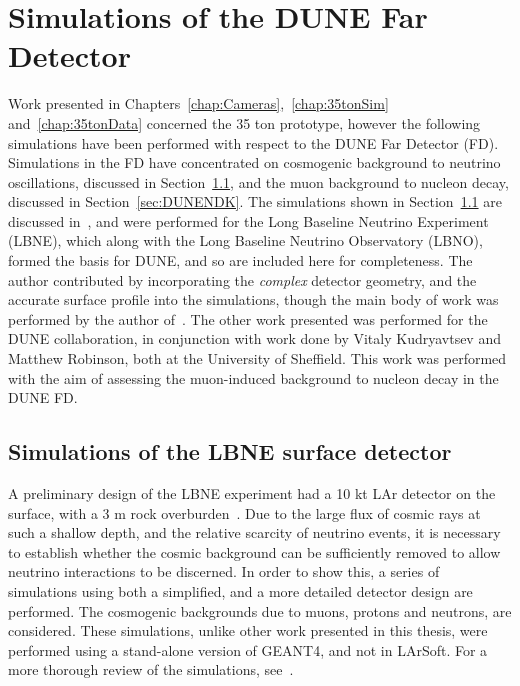 

\chapter{Simulations of the DUNE Far Detector} \label{chap:FDSims} %
\graphicspath{{FarDetectorSimulations/Figs/Raster/}{FarDetectorSimulations/Figs/PDF/}{FarDetectorSimulations/Figs/Vector/}}

Work presented in Chapters~\ref{chap:Cameras},~\ref{chap:35tonSim} and~\ref{chap:35tonData} concerned the 35 ton prototype, however the following simulations have been performed with respect to the DUNE Far Detector (FD). Simulations in the FD have concentrated on cosmogenic background to neutrino oscillations, discussed in Section~\ref{sec:LBNESurf}, and the muon background to nucleon decay, discussed in Section~\ref{sec:DUNENDK}. The simulations shown in Section~\ref{sec:LBNESurf} are discussed in~\citep{MartinsThesis}, and were performed for the Long Baseline Neutrino Experiment (LBNE), which along with the Long Baseline Neutrino Observatory (LBNO), formed the basis for DUNE, and so are included here for completeness. The author contributed by incorporating the \emph{complex} detector geometry, and the accurate surface profile into the simulations, though the main body of work was performed by the author of~\citep{MartinsThesis}. The other work presented was performed for the DUNE collaboration, in conjunction with work done by Vitaly Kudryavtsev and Matthew Robinson, both at the University of Sheffield. This work was performed with the aim of assessing the muon-induced background to nucleon decay in the DUNE FD. \\

\section{Simulations of the LBNE surface detector} \label{sec:LBNESurf} %
A preliminary design of the LBNE experiment had a 10 kt LAr detector on the surface, with a 3 m rock overburden~\citep{LBNE6493}. Due to the large flux of cosmic rays at such a shallow depth, and the relative scarcity of neutrino events, it is necessary to establish whether the cosmic background can be sufficiently removed to allow neutrino interactions to be discerned. In order to show this, a series of simulations using both a simplified, and a more detailed detector design are performed. The cosmogenic backgrounds due to muons, protons and neutrons, are considered. These simulations, unlike other work presented in this thesis, were performed using a stand-alone version of GEANT4, and not in LArSoft. For a more thorough review of the simulations, see~\citep{MartinsThesis}. \\

